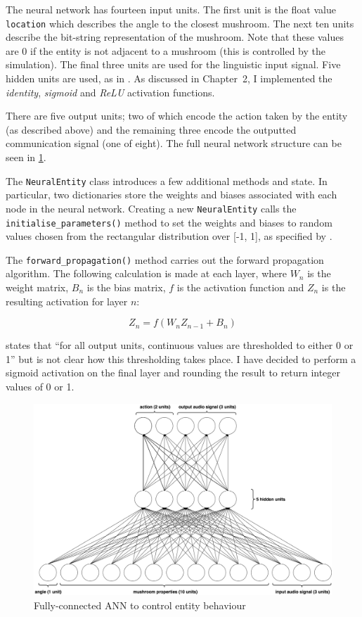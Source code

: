 \documentclass[12pt,a4paper]{report}
\begin{document}
The neural network has fourteen input units. The first unit is the float value \texttt{location} which describes the angle to the closest mushroom. The next ten units describe the bit-string representation of the mushroom. Note that these values are 0 if the entity is not adjacent to a mushroom (this is controlled by the simulation). The final three units are used for the linguistic input signal. Five hidden units are used, as in \citet{Cangelosi1998}. As discussed in Chapter~2, I implemented the \emph{identity}, \emph{sigmoid} and \emph{ReLU} activation functions.

There are five output units; two of which encode the action taken by the entity (as described above) and the remaining three encode the outputted communication signal (one of eight). The full neural network structure can be seen in \cref{fig:fullneural}.

The \texttt{NeuralEntity} class introduces a few additional methods and state. In particular, two dictionaries store the weights and biases associated with each node in the neural network. Creating a new \texttt{NeuralEntity} calls the \texttt{initialise\_parameters()} method to set the weights and biases to random values chosen from the rectangular distribution over [-1, 1], as specified by \citet{Cangelosi1998}.

The \texttt{forward\_propagation()} method carries out the forward propagation algorithm. The following calculation is made at each layer, where $W_n$ is the weight matrix, $B_n$ is the bias matrix, $f$ is the activation function and $Z_n$ is the resulting activation for layer $n$:

$$ Z_n = f(W_nZ_{n-1} + B_n) $$  

\citet{Cangelosi1998} states that ``for all output units, continuous values are thresholded to either 0 or 1'' but is not clear how this thresholding takes place. I have decided to perform a sigmoid activation on the final layer and rounding the result to return integer values of 0 or 1.

\begin{figure}[t]
  \centering
  \includegraphics[width=.9\linewidth]{figs/fullneural}
  \caption{Fully-connected ANN to control entity behaviour}
  \label{fig:fullneural}
\end{figure}
\end{document}
